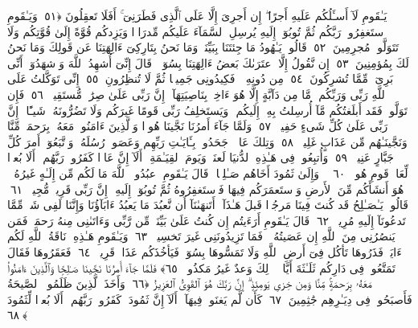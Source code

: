  يَـٰقَومِ لَآ أَسـَٔلُكُم عَلَيهِ أَجرًا ۖ إِن أَجرِىَ إِلَّا عَلَى ٱلَّذِى فَطَرَنِىٓ ۚ أَفَلَا تَعقِلُونَ ﴿٥١﴾
 وَيَـٰقَومِ ٱستَغفِرُوا۟ رَبَّكُم ثُمَّ تُوبُوٓا۟ إِلَيهِ يُرسِلِ ٱلسَّمَآءَ عَلَيكُم مِّدرَارًۭا وَيَزِدكُم قُوَّةً إِلَىٰ قُوَّتِكُم وَلَا تَتَوَلَّوا۟ مُجرِمِينَ ﴿٥٢﴾
 قَالُوا۟ يَـٰهُودُ مَا جِئتَنَا بِبَيِّنَةٍۢ وَمَا نَحنُ بِتَارِكِىٓ ءَالِهَتِنَا عَن قَولِكَ وَمَا نَحنُ لَكَ بِمُؤمِنِينَ ﴿٥٣﴾
 إِن نَّقُولُ إِلَّا ٱعتَرَىٰكَ بَعضُ ءَالِهَتِنَا بِسُوٓءٍۢ ۗ قَالَ إِنِّىٓ أُشهِدُ ٱللَّهَ وَٱشهَدُوٓا۟ أَنِّى بَرِىٓءٌۭ مِّمَّا تُشرِكُونَ ﴿٥٤﴾
 مِن دُونِهِۦ ۖ فَكِيدُونِى جَمِيعًۭا ثُمَّ لَا تُنظِرُونِ ﴿٥٥﴾
 إِنِّى تَوَكَّلتُ عَلَى ٱللَّهِ رَبِّى وَرَبِّكُم ۚ مَّا مِن دَآبَّةٍ إِلَّا هُوَ ءَاخِذٌۢ بِنَاصِيَتِهَآ ۚ إِنَّ رَبِّى عَلَىٰ صِرَٰطٍۢ مُّستَقِيمٍۢ ﴿٥٦﴾
 فَإِن تَوَلَّوا۟ فَقَد أَبلَغتُكُم مَّآ أُرسِلتُ بِهِۦٓ إِلَيكُم ۚ وَيَستَخلِفُ رَبِّى قَومًا غَيرَكُم وَلَا تَضُرُّونَهُۥ شَيـًٔا ۚ إِنَّ رَبِّى عَلَىٰ كُلِّ شَىءٍ حَفِيظٌۭ ﴿٥٧﴾
 وَلَمَّا جَآءَ أَمرُنَا نَجَّينَا هُودًۭا وَٱلَّذِينَ ءَامَنُوا۟ مَعَهُۥ بِرَحمَةٍۢ مِّنَّا وَنَجَّينَـٰهُم مِّن عَذَابٍ غَلِيظٍۢ ﴿٥٨﴾
 وَتِلكَ عَادٌۭ ۖ جَحَدُوا۟ بِـَٔايَـٰتِ رَبِّهِم وَعَصَوا۟ رُسُلَهُۥ وَٱتَّبَعُوٓا۟ أَمرَ كُلِّ جَبَّارٍ عَنِيدٍۢ ﴿٥٩﴾
 وَأُتبِعُوا۟ فِى هَـٰذِهِ ٱلدُّنيَا لَعنَةًۭ وَيَومَ ٱلقِيَـٰمَةِ ۗ أَلَآ إِنَّ عَادًۭا كَفَرُوا۟ رَبَّهُم ۗ أَلَا بُعدًۭا لِّعَادٍۢ قَومِ هُودٍۢ ﴿٦٠﴾
 ۞ وَإِلَىٰ ثَمُودَ أَخَاهُم صَـٰلِحًۭا ۚ قَالَ يَـٰقَومِ ٱعبُدُوا۟ ٱللَّهَ مَا لَكُم مِّن إِلَـٰهٍ غَيرُهُۥ ۖ هُوَ أَنشَأَكُم مِّنَ ٱلأَرضِ وَٱستَعمَرَكُم فِيهَا فَٱستَغفِرُوهُ ثُمَّ تُوبُوٓا۟ إِلَيهِ ۚ إِنَّ رَبِّى قَرِيبٌۭ مُّجِيبٌۭ ﴿٦١﴾
 قَالُوا۟ يَـٰصَـٰلِحُ قَد كُنتَ فِينَا مَرجُوًّۭا قَبلَ هَـٰذَآ ۖ أَتَنهَىٰنَآ أَن نَّعبُدَ مَا يَعبُدُ ءَابَآؤُنَا وَإِنَّنَا لَفِى شَكٍّۢ مِّمَّا تَدعُونَآ إِلَيهِ مُرِيبٍۢ ﴿٦٢﴾
 قَالَ يَـٰقَومِ أَرَءَيتُم إِن كُنتُ عَلَىٰ بَيِّنَةٍۢ مِّن رَّبِّى وَءَاتَىٰنِى مِنهُ رَحمَةًۭ فَمَن يَنصُرُنِى مِنَ ٱللَّهِ إِن عَصَيتُهُۥ ۖ فَمَا تَزِيدُونَنِى غَيرَ تَخسِيرٍۢ ﴿٦٣﴾
 وَيَـٰقَومِ هَـٰذِهِۦ نَاقَةُ ٱللَّهِ لَكُم ءَايَةًۭ فَذَرُوهَا تَأكُل فِىٓ أَرضِ ٱللَّهِ وَلَا تَمَسُّوهَا بِسُوٓءٍۢ فَيَأخُذَكُم عَذَابٌۭ قَرِيبٌۭ ﴿٦٤﴾
 فَعَقَرُوهَا فَقَالَ تَمَتَّعُوا۟ فِى دَارِكُم ثَلَـٰثَةَ أَيَّامٍۢ ۖ ذَٟلِكَ وَعدٌ غَيرُ مَكذُوبٍۢ ﴿٦٥﴾
 فَلَمَّا جَآءَ أَمرُنَا نَجَّينَا صَـٰلِحًۭا وَٱلَّذِينَ ءَامَنُوا۟ مَعَهُۥ بِرَحمَةٍۢ مِّنَّا وَمِن خِزىِ يَومِئِذٍ ۗ إِنَّ رَبَّكَ هُوَ ٱلقَوِىُّ ٱلعَزِيزُ ﴿٦٦﴾
 وَأَخَذَ ٱلَّذِينَ ظَلَمُوا۟ ٱلصَّيحَةُ فَأَصبَحُوا۟ فِى دِيَـٰرِهِم جَٰثِمِينَ ﴿٦٧﴾
 كَأَن لَّم يَغنَوا۟ فِيهَآ ۗ أَلَآ إِنَّ ثَمُودَا۟ كَفَرُوا۟ رَبَّهُم ۗ أَلَا بُعدًۭا لِّثَمُودَ ﴿٦٨﴾
